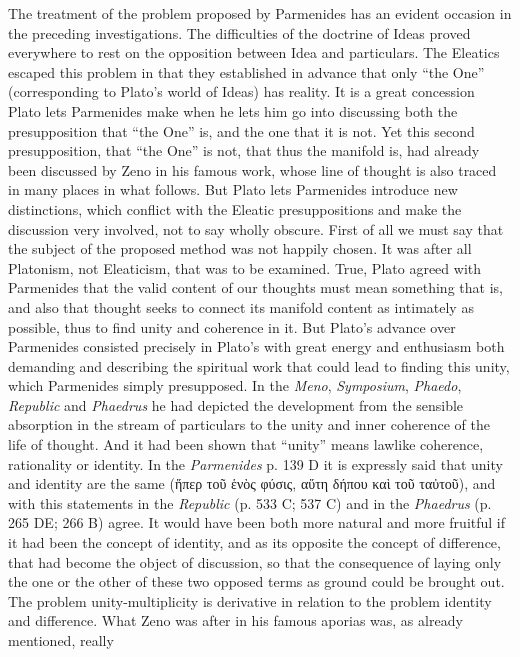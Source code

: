 \documentclass[12pt,a4paper,openany]{book}
\newcommand{\opage}[1]{\marginnote{\footnotesize\textit{[#1]}}}
\begin{document}
The treatment of the problem proposed by Parmenides has
an evident occasion in the preceding investigations. The difficulties
of the doctrine of Ideas proved everywhere to rest on the opposition
between Idea and particulars. The Eleatics escaped this
problem in that they established in advance that only ``the One''
(corresponding to Plato’s world of Ideas) has reality. It is a
great concession Plato lets Parmenides make when he
lets him go into discussing both the presupposition
that ``the One'' is, and the one that it is not. Yet this
second presupposition, that ``the One'' is not, that thus
the manifold is, had already been discussed by Zeno in his
famous work, whose line of thought is also traced in many
places in what follows. But Plato lets Parmenides introduce
new distinctions, which conflict with the Eleatic presuppositions
and make the discussion very involved, not to
say wholly obscure. First of all we must say that the subject of the
proposed method was not happily chosen. It was after all Platonism,
not Eleaticism, that was to be examined. True,
Plato agreed with Parmenides that the valid content
of our thoughts must mean something that is, and also that thought
seeks to connect its manifold content as intimately as
possible, thus to find unity and coherence in it. But
Plato’s advance over Parmenides consisted precisely in
Plato’s with great energy and enthusiasm both demanding and
describing the spiritual work that could lead to finding
this unity, which Parmenides simply presupposed. In
the \textit{Meno}, \textit{Symposium}, \textit{Phaedo}, \textit{Republic} and \textit{Phaedrus}
\setcounter{footnote}{0}%
\opage{28}he had depicted the development from the sensible absorption
in the stream of particulars to the unity and inner coherence of the life of thought.
And it had been shown that ``unity'' means lawlike
coherence, rationality or identity. In the \textit{Parmenides}
p. 139 D it is expressly said that unity and identity are
the same (ἥπερ τοῦ ἑνὸς φύσις, αὕτη δήπου καὶ τοῦ ταὐτοῦ),
and with this statements in the \textit{Republic} (p. 533 C; 537 C)
and in the \textit{Phaedrus} (p. 265 DE; 266 B) agree. It would have been
both more natural and more fruitful if it had been
the concept of identity, and as its opposite the concept of difference,
that had become the object of discussion, so that
the consequence of laying only the one or the other of
these two opposed terms as ground could be brought out.
The problem unity-multiplicity is derivative in relation to
the problem identity and difference. What Zeno was after
in his famous aporias was, as already mentioned, really
\end{document}
